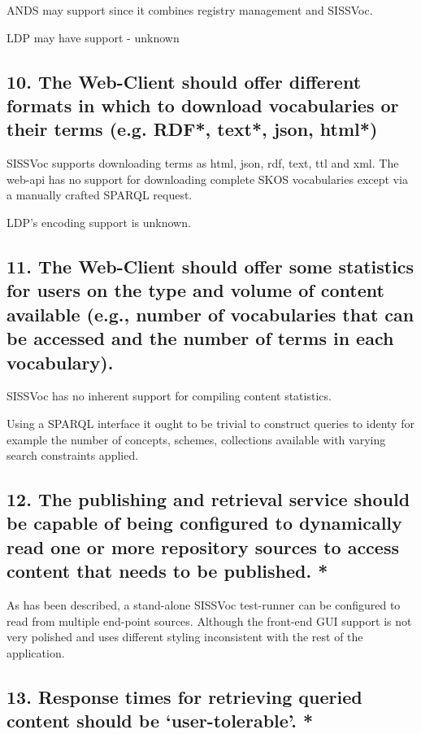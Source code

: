 \documentclass[10pt,a4paper]{article}
\begin{document}
\begin{flushleft}
\item [ANDS] may support since it combines registry management and SISSVoc. 

\item [LDP] may have support - unknown



\subsection{ 10. The Web-Client should offer different formats in which to
download vocabularies or their terms (e.g. RDF*, text*, json, html*) }

SISSVoc supports downloading terms as html, json, rdf, text, ttl and xml. The
web-api has no support for downloading complete SKOS vocabularies except via a
manually crafted SPARQL request.

LDP's encoding support is unknown.

\subsection{ 11. The Web-Client should offer some statistics for users on the
type and volume of content available (e.g., number of vocabularies that can be
accessed and the number of terms in each vocabulary).  }
 

SISSVoc has no inherent support for compiling content statistics.

Using a SPARQL interface it ought to be trivial to construct queries to identy
for example the number of concepts, schemes, collections available with varying
search constraints applied. 

\subsection{ 12. The publishing and retrieval service should be capable of
being configured to dynamically read one or more repository sources to access
content that needs to be published. * }

As has been described, a stand-alone SISSVoc test-runner can be configured to
read from multiple end-point sources. Although the front-end GUI support is not
very polished and uses different styling inconsistent with the rest of the
application.


\subsection{ 
13. Response times for retrieving queried content should be ‘user-tolerable’. *
}


\end{flushleft}
\end{document}
